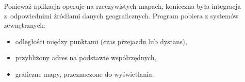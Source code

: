Ponieważ aplikacja operuje na rzeczywistych mapach, konieczna była integracja z~odpowiednimi źródłami danych geograficznych. Program pobiera z systemów zewnętrznych:
\begin{itemize}
	\item odległości między punktami (czas przejazdu lub dystans),
	\item przybliżony adres na podstawie współrzędnych,
	\item graficzne mapy, przeznaczone do wyświetlania.
\end{itemize}
